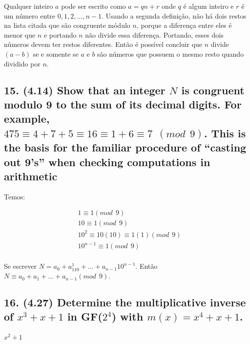 \documentclass[fleqn, 12pt]{article}
\begin{document}
    Qualquer inteiro $a$ pode ser escrito como $a = qn + r$ onde $q$ é algum
    inteiro e $r$ é um número entre $0, 1, 2, \dots, n - 1$. Usando a segunda
    definição, não há dois restos na lista citada que são congruente módulo $n$,
    porque a diferença entre eles é menor que $n$ e portando $n$ não divide essa
    diferença. Portando, esses dois números devem ter restos diferentes. Então é
    possível concluir que $n$ divide $(a - b)$ se e somente se $a$ e $b$ são
    números que possuem o mesmo resto quando dividido por $n$.

\subsection*{15. (4.14) Show that an integer $N$ is congruent modulo 9 to the
sum of its decimal digits. For example, $475 \equiv 4 + 7 + 5 \equiv 16 \equiv 1
+ 6 \equiv 7 \ \ (mod \ \ 9)$. This is the basis for the familiar procedure of
“casting out 9’s” when checking computations in arithmetic}

    Temos:

    \begin{align*}
      & 1 \equiv 1 (mod \ \ 9) \\
      & 10 \equiv 1 (mod \ \ 9) \\
      & 10^2 \equiv 10(10) \equiv 1(1) (mod \ \ 9) \\
      & 10^{n-1} \equiv 1 (mod \ \ 9) \\
    \end{align*}

    Se escrever $N = a_0 + a_110^1 + \dots + a_{n-1}10^{n-1}$. Então $N \equiv
    a_0 + a_1 + \dots + a_{n-1} (mod \ \ 9)$.

\subsection*{16. (4.27) Determine the multiplicative inverse of $x^3 + x + 1$ in
GF($2^4$) with $m(x) = x^4 + x + 1$.}

    $x^2 + 1$
\end{document}
